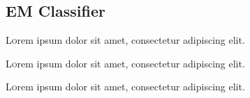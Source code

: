 \subsection{EM Classifier}

\lettrine[nindent=0em,lines=3]{L} orem ipsum dolor sit amet, consectetur adipiscing elit.
\lipsum[2-3] %

\lettrine[nindent=0em,lines=3]{L} orem ipsum dolor sit amet, consectetur adipiscing elit.
\lipsum[2-3] %

\lettrine[nindent=0em,lines=3]{L} orem ipsum dolor sit amet, consectetur adipiscing elit.
\lipsum[2-3] %

